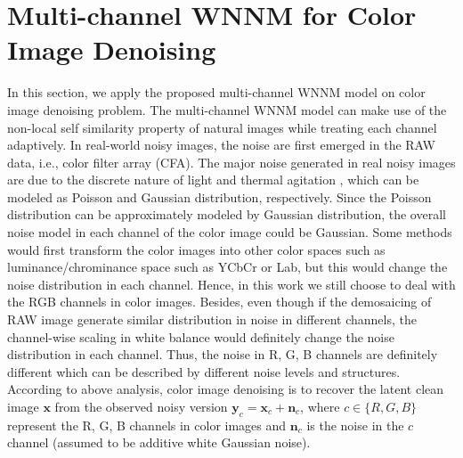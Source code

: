 \documentclass[10pt,twocolumn,letterpaper]{article}
\begin{document}
\section{Multi-channel WNNM for Color Image Denoising}
In this section, we apply the proposed multi-channel WNNM model on color image denoising problem. The multi-channel WNNM model can make use of the non-local self similarity property of natural images while treating each channel adaptively. In real-world noisy images, the noise are first emerged in the RAW data, i.e., color filter array (CFA). The major noise generated in real noisy images are due to the discrete nature of light and thermal agitation \cite{}, which can be modeled as Poisson and Gaussian distribution, respectively. Since the Poisson distribution can be approximately modeled by Gaussian distribution, the overall noise model in each channel of the color image could be Gaussian. Some methods would first transform the color images into other color spaces such as luminance/chrominance space such as YCbCr or Lab, but this would change the noise distribution in each channel. Hence, in this work we still choose to deal with the RGB channels in color images. Besides, even though if the demosaicing of RAW image generate similar distribution in noise in different channels, the channel-wise scaling in white balance would definitely change the noise distribution in each channel. Thus, the noise in R, G, B channels are definitely different which can be described by different noise levels and structures. According to above analysis, color image denoising is to recover the latent clean image $\mathbf{x}$ from the observed noisy version $\mathbf{y}_{c}=\mathbf{x}_{c}+\mathbf{n}_{c}$, where $c\in \{R, G, B\}$ represent the R, G, B channels in color images and $\mathbf{n}_{c}$ is the noise in the $c$ channel 
(assumed to be additive white Gaussian noise).
\end{document}
